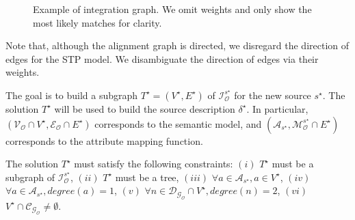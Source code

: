 \documentclass[letterpaper]{article} %
\newcommand{\authornote}[3]{
  {\fbox{\sc 
  #1}:$\blacktriangleright$\textcolor{#2}{\small{#3}}$\blacktriangleleft$}%
}
\newcommand{\npr}[1]{\authornote{NPR}{orange}{#1}}
\newcommand{\forijcai}[1]{}
\begin{document}
\begin{figure}[t]
{ }
\caption{Example of integration graph. We omit weights and only show the most likely 
matches for clarity.\forijcai{ Data node
are the same as in Fig. \ref{FIG:ali}.}}
\label{FIG:inte}
\vspace{-5mm}
\end{figure}

Note that, although the alignment graph is directed, we disregard the
direction of edges for the STP model.
We disambiguate the direction \forijcai{and semantics} of edges via their
weights.
\forijcai{We can further improve this step by using patterns.}

The goal is to build a subgraph $T^\star= (V^\star, E^\star)$ of
$\mathcal{I}_\mathcal{O}^{s^\star}$ for the new source $s^\star$. The solution 
$T^\star$ will 
be used to build the source description $\delta^\star$. 
In particular, $(\mathcal{V_O} \cap V^\star,\mathcal{E_O} \cap E^\star)$ 
corresponds to the semantic model, and 
$(\mathcal{A}_{s^\star},\mathcal{M}_\mathcal{O}^{s^\star} \cap E^\star)$ 
corresponds to 
the attribute mapping function.

The solution $T^\star$ must satisfy the following constraints:
	$(i)$ %
	$T^\star$ must be a subgraph of $\mathcal{I}_\mathcal{O}^{s^\star}$,
	$(ii)$ %
	$T^\star$ must be a tree,
	$(iii)$ %
	$\forall a \in \mathcal{A}_{s^\star}, a\in V^\star$,
	$(iv)$ %
	$\forall a \in \mathcal{A}_{s^\star}, degree(a) = 1$,
	$(v)$ %
	$\forall n \in \mathcal{D_{G_O}} \cap V^\star, degree(n) = 2$,
	$(vi)$ 
	$V^\star \cap \mathcal{C_{G_O}} \neq \emptyset$.
\end{document}
